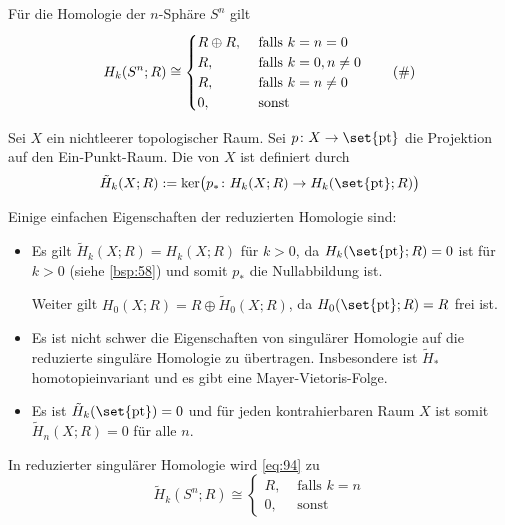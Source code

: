 \begin{satz}[{name=[{Homologie der $n$-Sphäre}]},label=satz:94]
	Für die Homologie der $n$-Sphäre $S^n$ gilt
	\begin{equation*}
		H_k \enbrace*{S^n ;R} \cong \begin{cases}
			R \oplus R , &\text{ falls }k=n=0\\
			R, &\text{ falls } k=0, n \not= 0 \\
			R, &\text{ falls } k=n\not= 0 \\
			0, &\text{ sonst}
		\end{cases} \label{eq:94} \tag{\#}
	\end{equation*}
\end{satz}

\begin{definition}[{name=[Reduzierte Homologie]}]
	Sei $X$ ein nichtleerer topologischer Raum. 
	Sei $p \colon X  \to \set{\mathrm{pt}}$ die Projektion auf den Ein-Punkt-Raum. 
	Die  von $X$ ist definiert durch 
	\[
		\tilde{H}_k(X;R) := \ker \enbrace[\big]{ p_* \colon H_k(X;R) \to H_k(\set{\mathrm{pt}};R )} 
	\]
\end{definition}

Einige einfachen Eigenschaften der reduzierten Homologie sind:
\begin{itemize}
	\item Es gilt $\tilde{H}_k(X;R) =H_k(X;R)$ für $k>0$, da $H_k \enbrace*{\set{\mathrm{pt}};R }=0$ ist für $k>0$ (siehe \ref{bsp:58}) und somit $p_*$ die Nullabbildung ist.
	
	Weiter gilt $H_0(X;R) = R \oplus \tilde{H}_0(X;R)$, da $H_0(\set{\mathrm{pt}};R)=R$ frei ist.
	\item Es ist nicht schwer die Eigenschaften von singulärer Homologie auf die reduzierte singuläre Homologie zu übertragen. Insbesondere ist $\tilde{H}_*$ 
	homotopieinvariant und es gibt eine Mayer-Vietoris-Folge.
	\item Es ist $\tilde{H}_k \enbrace*{\set{\mathrm{pt}}}=0$ und für jeden kontrahierbaren Raum $X$ ist somit $\tilde{H}_n(X;R)=0$ für alle $n$.
\end{itemize}

\begin{bemerkung}[{name=[{Die Aussage von \autoref{satz:94} in reduzierter Homologie}]}]
	In reduzierter singulärer Homologie wird \eqref{eq:94} zu
	\begin{equation*}
		\tilde{H}_k(S^n;R) \cong \begin{cases}
			R, &\text{ falls }k=n\\
			0 , &\text{ sonst}
		\end{cases} \label{eq:96}\tag{\#\#}
	\end{equation*}
\end{bemerkung}

